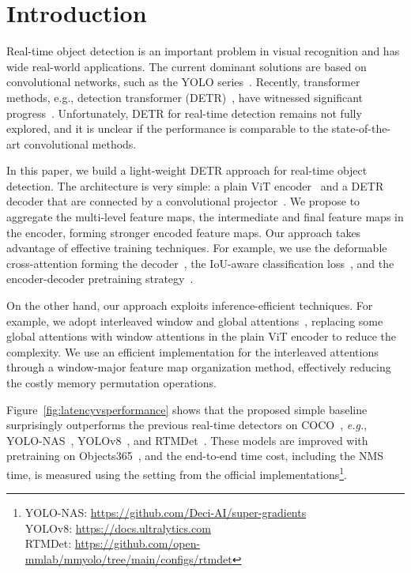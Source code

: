 \documentclass[runningheads]{llncs}
\begin{document}
\section{Introduction}
\label{sec:intro}

Real-time object detection is an important problem in visual recognition and has wide real-world applications. The current dominant solutions are based on convolutional networks, such as the YOLO series~\cite{bochkovskiy2020yolov4,ge2021yolox,xu2022pp,wang2023yolov7,li2022yolov6,li2023yolov6,lyu2022rtmdet,yolov8_ultralytics,supergradients}. Recently, transformer methods, e.g., detection transformer (DETR)~\cite{carion2020end}, have witnessed significant progress~\cite{zhu2020deformable,meng2021conditional,gao2022adamixer,wang2022anchor,liu2022dab,zhang2022dino,chen2022group,zong2023detrs}. Unfortunately, DETR for real-time detection remains not fully explored, and it is unclear if the performance is comparable to the state-of-the-art convolutional methods.

In this paper, we build a light-weight DETR approach for real-time object detection. The architecture is very simple: a plain ViT encoder~\cite{dosovitskiy2020image} and a DETR decoder that are connected by a convolutional projector~\cite{yolov8_ultralytics}. We propose to aggregate the multi-level feature maps, the intermediate and final feature maps in the encoder, forming stronger encoded feature maps. Our approach takes advantage of effective training techniques. For example, we use the deformable cross-attention forming the decoder~\cite{zhu2020deformable}, the IoU-aware classification loss~\cite{cai2023align}, and the encoder-decoder pretraining strategy~\cite{zhang2023cae,zhang2022dino,chen2022group}.

On the other hand, our approach exploits inference-efficient techniques. For example, we adopt interleaved window and global attentions~\cite{li2021benchmarking,li2022exploring}, replacing some global attentions with window attentions in the plain ViT encoder to reduce the complexity. We use an efficient implementation for the interleaved attentions through a window-major feature map organization method, effectively reducing the costly memory permutation operations.

Figure~\ref{fig:latencyvsperformance} shows that the proposed simple baseline surprisingly outperforms the previous real-time detectors on COCO~\cite{lin2014microsoft}, \emph{e.g.}, YOLO-NAS~\cite{supergradients}, YOLOv8~\cite{yolov8_ultralytics}, and RTMDet~\cite{lyu2022rtmdet}. These models are improved with pretraining on Objects365~\cite{shao2019objects365}, and the end-to-end time cost, including the NMS time, is measured using the setting from the official implementations\footnote{\tiny
YOLO-NAS: \url{https://github.com/Deci-AI/super-gradients}\\
YOLOv8: \url{https://docs.ultralytics.com}\\
RTMDet: \url{https://github.com/open-mmlab/mmyolo/tree/main/configs/rtmdet}
}.
\end{document}
